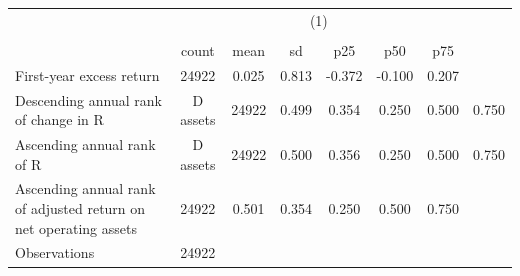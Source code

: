 {
\def\sym#1{\ifmmode^{#1}\else\(^{#1}\)\fi}
\begin{tabular}{l*{1}{cccccc}}
\hline\hline
                    &                                                      \\
                    &                                                         \\
                    &       count&        mean&          sd&         p25&         p50&         p75\\
\hline
First-year excess return&       24922&       0.025&       0.813&      -0.372&      -0.100&       0.207\\
Descending annual rank of change in R&D assets&       24922&       0.499&       0.354&       0.250&       0.500&       0.750\\
Ascending annual rank of R&D assets&       24922&       0.500&       0.356&       0.250&       0.500&       0.750\\
Ascending annual rank of adjusted return on net operating assets&       24922&       0.501&       0.354&       0.250&       0.500&       0.750\\
\hline
Observations        &       24922&            &            &            &            &            \\
\hline\hline
\end{tabular}
}
